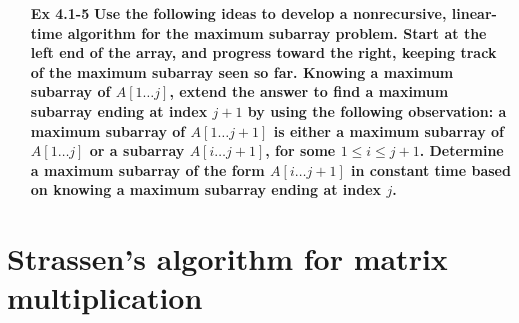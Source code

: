 \documentclass[fontsize=12pt,paper=a4,open=any]{book}
\begin{document}
\begin{enumerate}
	\item[\textbf{Ex 4.1-5}]
		\textbf{Use the following ideas to develop a nonrecursive, linear-time algorithm for the maximum subarray problem. Start at the left end of the array, and progress toward the right, keeping track of the maximum subarray seen so far. Knowing a maximum subarray of $A[1 \dots j]$, extend the answer to find a maximum subarray ending at index $j+1$ by using the following observation: a maximum subarray of $A[1 \dots j+1]$ is either a maximum subarray of $A[1 \dots j]$ or a subarray $A[i \dots j+1]$, for some $1 \leq i \leq j+1$. Determine a maximum subarray of the form $A[i \dots j+1]$ in constant time based on knowing a maximum subarray ending at index $j$.}		
\end{enumerate}

\section{Strassen’s algorithm for matrix multiplication}
\end{document}
